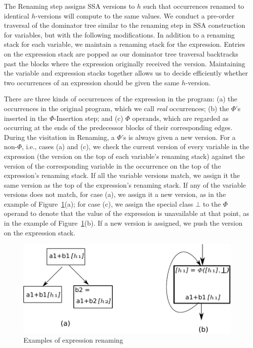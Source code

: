 The Renaming step assigns SSA versions to $h$ such that occurrences
renamed to identical $h$-versions will compute to the same values.
We conduct a pre-order traversal of the dominator tree similar to the renaming
step in SSA construction for variables, but with the following modifications.
In addition to a renaming stack for each variable, we
maintain a renaming stack for the expression. Entries on the expression
stack are popped as our dominator tree traversal backtracks past the
blocks where the expression originally received the version.  
Maintaining the variable and expression stacks
together allows us to decide efficiently whether two occurrences of an
expression should be given the same $h$-version.

There are three kinds of occurrences of the expression in the program:
(a) the occurrences in the original program, which we call \emph{real}
occurrences; (b) the $\Phi$'s inserted in the $\Phi$-Insertion step; and
(c) $\Phi$ operands, which are regarded as occurring at the ends of the
predecessor blocks of their corresponding edges.  During the visitation in 
Renaming, a $\Phi$'s is always given a new version.  For a non-$\Phi$, i.e.,
cases (a) and (c),
we check the current version of every variable in the expression (the
version on the top of each variable's renaming stack) against the version of
the corresponding variable in the occurrence on the top of the expression's
renaming stack.  If all the variable versions match, we assign it the same
version as the top of the expression's renaming stack.  If any of the 
variable versions does not match, for case (a), we assign it a new version, as
in the example of Figure~\ref{fig: rename}(a); for case (c),
we assign the special class $\bot$ to the $\Phi$ operand to denote that
the value of the expression is unavailable at that point, as in the example
of Figure~\ref{fig: rename}(b).  If a new version is assigned, we push
the version on the expression stack.

\begin{figure}
\centering
\includegraphics[scale=0.45]{fig-rename.pdf}
\caption{Examples of expression renaming}
\label{fig: rename}
\end{figure}
  
